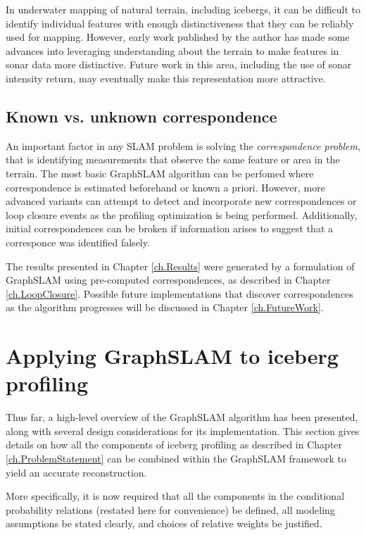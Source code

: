 In underwater mapping of natural terrain, including icebergs, it can be difficult to identify individual features with enough distinctiveness that they can be reliably used for mapping. However, early work published by the author has made some advances into leveraging understanding about the terrain to make features in sonar data more distinctive. \cite{Hammond2014b} Future work in this area, including the use of sonar intensity return, may eventually make this representation more attractive.


\subsection{Known vs. unknown correspondence}

An important factor in any SLAM problem is solving the \emph{correspondence problem}, that is identifying measurements that observe the same feature or area in the terrain. The most basic GraphSLAM algorithm can be perfomed where correspondence is estimated beforehand or known a priori. However, more advanced variants can attempt to detect and incorporate new correspondences or loop closure events as the profiling optimization is being performed. Additionally, initial correspondences can be broken if information arises to suggest that a corresponce was identified falsely. 

The results presented in Chapter \ref{ch.Results} were generated by a formulation of GraphSLAM using pre-computed correspondences, as described in Chapter \ref{ch.LoopClosure}. Possible future implementations that discover correspondences as the algorithm progresses will be discussed in Chapter \ref{ch.FutureWork}.

\section{Applying GraphSLAM to iceberg profiling}

Thus far, a high-level overview of the GraphSLAM algorithm has been presented, along with several design considerations for its implementation. This section gives details on how all the components of iceberg profiling as described in Chapter \ref{ch.ProblemStatement} can be combined within the GraphSLAM framework to  yield an accurate reconstruction. 

More specifically, it is now required that all the components in the conditional probability relations (restated here for convenience) be defined, all modeling assumptions be stated clearly, and choices of relative weights be justified. 

